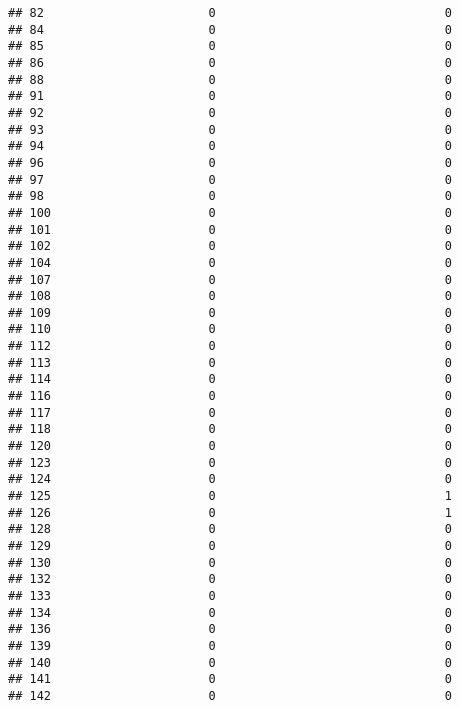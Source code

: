 \documentclass[
]{article}
\begin{document}
\begin{verbatim}
## 82                       0                                0
## 84                       0                                0
## 85                       0                                0
## 86                       0                                0
## 88                       0                                0
## 91                       0                                0
## 92                       0                                0
## 93                       0                                0
## 94                       0                                0
## 96                       0                                0
## 97                       0                                0
## 98                       0                                0
## 100                      0                                0
## 101                      0                                0
## 102                      0                                0
## 104                      0                                0
## 107                      0                                0
## 108                      0                                0
## 109                      0                                0
## 110                      0                                0
## 112                      0                                0
## 113                      0                                0
## 114                      0                                0
## 116                      0                                0
## 117                      0                                0
## 118                      0                                0
## 120                      0                                0
## 123                      0                                0
## 124                      0                                0
## 125                      0                                1
## 126                      0                                1
## 128                      0                                0
## 129                      0                                0
## 130                      0                                0
## 132                      0                                0
## 133                      0                                0
## 134                      0                                0
## 136                      0                                0
## 139                      0                                0
## 140                      0                                0
## 141                      0                                0
## 142                      0                                0

\end{verbatim}
\end{document}
